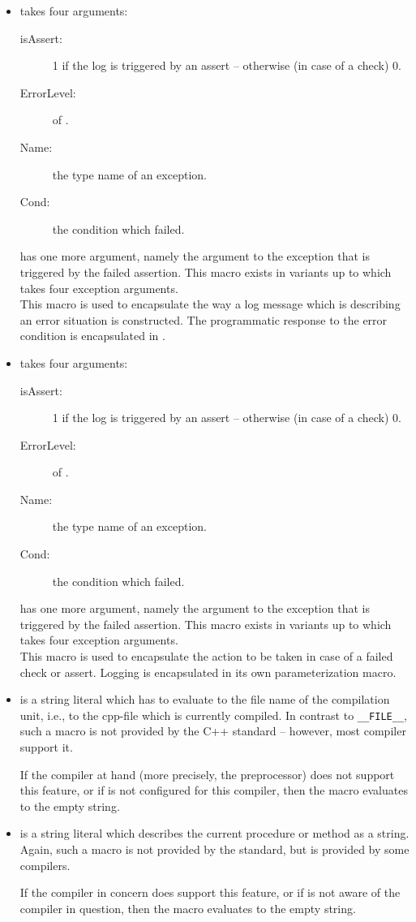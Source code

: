 \begin{itemize}
\item \InternalParamLogActionA takes four arguments:
  \begin{description}
  \item[isAssert:] 1 if the log is triggered by an assert -- otherwise
    (in case of a check) 0.
  \item[ErrorLevel:] of \VerbosityLevelType. 
  \item[Name:] the type name of an exception.
  \item[Cond:] the condition which failed.
  \end{description}
  \InternalParamLogActionB has one more argument, namely the
  argument to the exception that is triggered by the failed assertion.
  This macro exists in variants up to \InternalParamLogActionE
  which takes four exception arguments.\\
  This macro is used to encapsulate the way a log message which is
  describing an error situation is constructed. The programmatic
  response to the error condition is encapsulated in
  .
\item \InternalParamThrowActionA takes four arguments:
  \begin{description}
  \item[isAssert:] 1 if the log is triggered by an assert -- otherwise
    (in case of a check) 0.
  \item[ErrorLevel:] of \VerbosityLevelType. 
  \item[Name:] the type name of an exception.
  \item[Cond:] the condition which failed.
  \end{description}
  \InternalParamThrowActionB has one more argument, namely the
  argument to the exception that is triggered by the failed assertion.
  This macro exists in variants up to \InternalParamThrowActionE
  which takes four exception arguments.\\
  This macro is used to encapsulate the action to be taken in case of
  a failed check or assert.
  Logging is encapsulated in its own parameterization macro.
\item \InternalParamBaseFile is a string literal which has to evaluate
  to the file name of the compilation unit, i.e., to the cpp-file
  which is currently compiled.
  In contrast to {\tt \_\_FILE\_\_}, such a macro is not provided by
  the C++ standard -- however, most compiler support it. 
  
  If the compiler at hand (more precisely, the preprocessor) does not support
  this feature, or if \SYNEIGHT is not configured for this compiler,
  then the macro evaluates to the empty string.
\item \InternalParamPrettyFunction is a string literal which describes
  the current procedure or method as a string. Again, such a macro is
  not provided by the standard, but is provided by some compilers.
  
  If the compiler in concern does support this feature, or if \SYNEIGHT
  is not aware of the compiler in question, then the macro evaluates
  to the empty string.
\end{itemize}




